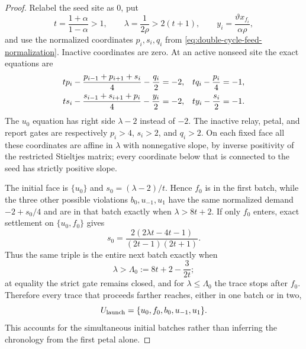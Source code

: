 \begin{proof}
Relabel the seed site as $0$, put
\begin{equation*}
 t=\frac{1+\alpha}{1-\alpha}>1,
 \qquad \lambda=\frac1{2\rho}>2(t+1),
 \qquad
 y_i=\frac{\vartheta x_{f_i}}{\alpha\rho},
\end{equation*}
and use the normalized coordinates $p_i,s_i,q_i$ from
\cref{eq:double-cycle-feed-normalization}.  Inactive coordinates are zero.
At an active nonseed site the exact equations are
\begin{align}
 t p_i-\frac{p_{i-1}+p_{i+1}+s_i}{4}-\frac{q_i}{2}&=-2,
 &
 t q_i-\frac{p_i}{4}&=-1,
 \notag\\
 t s_i-\frac{s_{i-1}+s_{i+1}+p_i}{4}-\frac{y_i}{2}&=-2,
 &
 t y_i-\frac{s_i}{2}&=-1.
 \label{eq:double-cycle-anchor-active-equations}
\end{align}
The $u_0$ equation has right side $\lambda-2$ instead of $-2$.
The inactive relay, petal, and report gates are respectively
$p_i>4$, $s_i>2$, and $q_i>2$.  On each fixed face all these coordinates are
affine in $\lambda$ with nonnegative slope, by inverse positivity of the
restricted Stieltjes matrix; every coordinate below that is connected to the
seed has strictly positive slope.

The initial face is $\{u_0\}$ and $s_0=(\lambda-2)/t$.  Hence $f_0$ is in
the first batch, while the three other possible violations
$b_0,u_{-1},u_1$ have the same normalized demand $-2+s_0/4$ and are in that
batch exactly when $\lambda>8t+2$.  If only $f_0$ enters, exact settlement on
$\{u_0,f_0\}$ gives
\begin{equation*}
 s_0=\frac{2(2\lambda t-4t-1)}{(2t-1)(2t+1)}.
\end{equation*}
Thus the same triple is the entire next batch exactly when
\begin{equation}
 \lambda>\Lambda_0:=8t+2-\frac{3}{2t};
 \label{eq:double-cycle-anchor-launch}
\end{equation}
at equality the strict gate remains closed, and for
$\lambda\leq\Lambda_0$ the trace stops after $f_0$.  Therefore every trace
that proceeds farther reaches, either in one batch or in two,
\begin{equation*}
 U_{\rm launch}=\{u_0,f_0,b_0,u_{-1},u_1\}.
\end{equation*}
This accounts for the simultaneous initial batches rather than inferring the
chronology from the first petal alone.


\end{proof}
